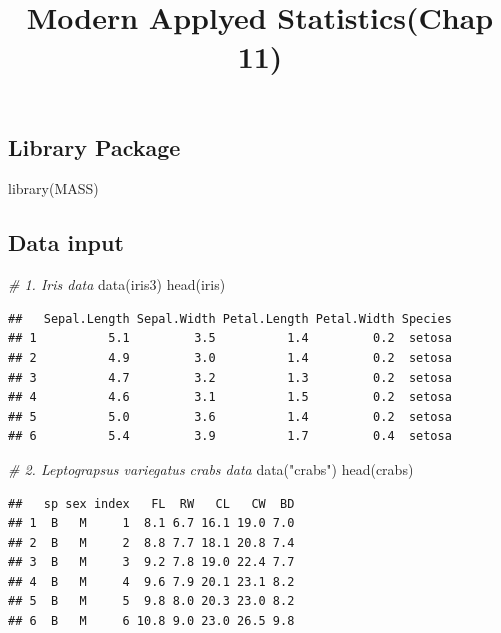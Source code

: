 \documentclass[
]{article}
\title{Modern Applyed Statistics(Chap 11)}
\author{}
\date{\vspace{-2.5em}}
\newenvironment{Shaded}{\begin{snugshade}}{\end{snugshade}}
\newcommand{\CommentTok}[1]{\textcolor[rgb]{0.56,0.35,0.01}{\textit{#1}}}
\newcommand{\FunctionTok}[1]{\textcolor[rgb]{0.00,0.00,0.00}{#1}}
\newcommand{\NormalTok}[1]{#1}
\newcommand{\StringTok}[1]{\textcolor[rgb]{0.31,0.60,0.02}{#1}}
\begin{document}
\maketitle

\hypertarget{library-package}{%
\subsection{Library Package}\label{library-package}}

\begin{Shaded}
\begin{Highlighting}[]
\FunctionTok{library}\NormalTok{(MASS)}
\end{Highlighting}
\end{Shaded}

\hypertarget{data-input}{%
\subsection{Data input}\label{data-input}}

\begin{Shaded}
\begin{Highlighting}[]
\CommentTok{\# 1. Iris data}
\FunctionTok{data}\NormalTok{(iris3)}
\FunctionTok{head}\NormalTok{(iris)}
\end{Highlighting}
\end{Shaded}

\begin{verbatim}
##   Sepal.Length Sepal.Width Petal.Length Petal.Width Species
## 1          5.1         3.5          1.4         0.2  setosa
## 2          4.9         3.0          1.4         0.2  setosa
## 3          4.7         3.2          1.3         0.2  setosa
## 4          4.6         3.1          1.5         0.2  setosa
## 5          5.0         3.6          1.4         0.2  setosa
## 6          5.4         3.9          1.7         0.4  setosa
\end{verbatim}

\begin{Shaded}
\begin{Highlighting}[]
\CommentTok{\# 2. Leptograpsus variegatus crabs data}
\FunctionTok{data}\NormalTok{(}\StringTok{"crabs"}\NormalTok{)}
\FunctionTok{head}\NormalTok{(crabs)}
\end{Highlighting}
\end{Shaded}

\begin{verbatim}
##   sp sex index   FL  RW   CL   CW  BD
## 1  B   M     1  8.1 6.7 16.1 19.0 7.0
## 2  B   M     2  8.8 7.7 18.1 20.8 7.4
## 3  B   M     3  9.2 7.8 19.0 22.4 7.7
## 4  B   M     4  9.6 7.9 20.1 23.1 8.2
## 5  B   M     5  9.8 8.0 20.3 23.0 8.2
## 6  B   M     6 10.8 9.0 23.0 26.5 9.8
\end{verbatim}
\end{document}
